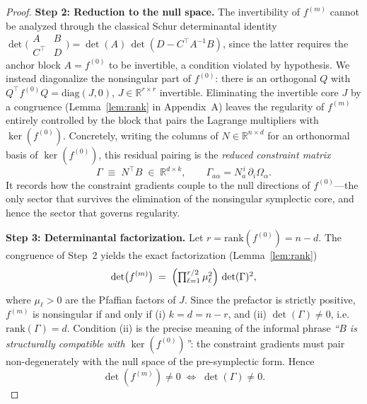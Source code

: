 \documentclass[11pt,a4paper]{article}
\begin{document}
\begin{proof}
		\smallskip
		\textbf{Step 2: Reduction to the null space.}
		The invertibility of $f^{(m)}$ cannot be analyzed through the classical Schur determinantal identity
		$\det\!\bigl(\begin{smallmatrix} A & B \\ C^\top & D \end{smallmatrix}\bigr) = \det(A)\,\det(D - C^\top A^{-1} B)$,
		since the latter requires the anchor block $A=f^{(0)}$ to be invertible, a condition violated by hypothesis. We instead diagonalize the nonsingular part of $f^{(0)}$: there is an orthogonal $Q$ with $Q^{\top}f^{(0)}Q = \mathrm{diag}(J,0)$, $J\in\mathbb{R}^{r\times r}$ invertible. Eliminating the invertible core $J$ by a congruence (Lemma~\ref{lem:rank} in Appendix~A) leaves the regularity of $f^{(m)}$ entirely controlled by the block that pairs the Lagrange multipliers with $\ker(f^{(0)})$. Concretely, writing the columns of $N\in\mathbb{R}^{n\times d}$ for an orthonormal basis of $\ker(f^{(0)})$, this residual pairing is the \emph{reduced constraint matrix}
		\begin{equation}\label{eq:gammadef}
			\Gamma \;\equiv\; N^{\top} B \;\in\; \mathbb{R}^{d\times k},
			\qquad \Gamma_{a\alpha} = N_a^{\,i}\,\partial_i\Omega_\alpha .
		\end{equation}
		It records how the constraint gradients couple to the null directions of $f^{(0)}$---the only sector that survives the elimination of the nonsingular symplectic core, and hence the sector that governs regularity.
		
		\smallskip
		\textbf{Step 3: Determinantal factorization.}
		Let $r = \mathrm{rank}(f^{(0)}) = n - d$. The congruence of Step~2 yields the exact factorization (Lemma~\ref{lem:rank})
		\begin{equation}\label{eq:detfactor}
			\det\bigl(f^{(m)}\bigr) \;=\; \Bigl(\textstyle\prod_{\ell=1}^{r/2}\mu_\ell^{2}\Bigr)\,\det(\Gamma)^2 ,
		\end{equation}
		where $\mu_\ell>0$ are the Pfaffian factors of $J$. Since the prefactor is strictly positive, $f^{(m)}$ is nonsingular if and only if (i) $k = d = n-r$, and (ii) $\det(\Gamma)\neq 0$, i.e.\ $\mathrm{rank}(\Gamma)=d$. Condition (ii) is the precise meaning of the informal phrase \emph{``$B$ is structurally compatible with $\ker(f^{(0)})$''}: the constraint gradients must pair non-degenerately with the null space of the pre-symplectic form. Hence
		\begin{equation}\label{eq:schurcriterion}
			\det(f^{(m)}) \neq 0 \;\iff\; \det(\Gamma) \neq 0 .
		\end{equation}
		

\end{proof}
\end{document}
